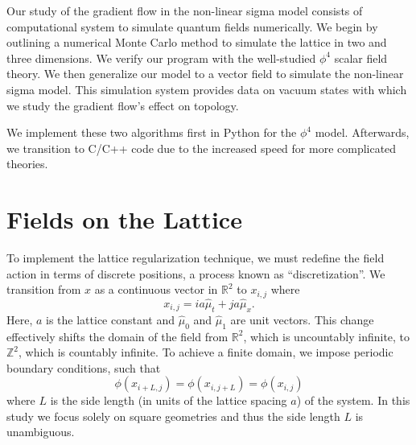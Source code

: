 Our study of the gradient flow in the non-linear sigma model consists of computational system to simulate quantum fields numerically. We begin by outlining a numerical Monte Carlo method to simulate the lattice in two and three dimensions. We verify our program with the well-studied $\phi^4$ scalar field theory. We then generalize our model to a vector field to simulate the non-linear sigma model. This simulation system provides data on vacuum states with which we study the gradient flow's effect on topology.

We implement these two algorithms first in Python for the $\phi^4$ model. Afterwards, we transition to C/C++ code due to the increased speed for more complicated theories. 



\section{Fields on the Lattice}
To implement the lattice regularization technique, we must redefine the field action in terms of discrete positions, a process known as ``discretization''. We transition from $x$ as a continuous vector in $\mathbb{R}^2$ to $x_{i,j}$ where
\begin{equation}
    x_{i,j} = ia \hat{\mu}_t + j a \hat{\mu}_x.
\end{equation}
Here, $a$ is the lattice constant and $\hat{\mu}_0$ and $\hat{\mu}_1$ are unit vectors. This change effectively shifts the domain of the field from $\mathbb{R}^2$, which is uncountably infinite, to $\mathbb{Z}^2$, which is countably infinite. To achieve a finite domain, we impose periodic boundary conditions, such that 
\begin{equation}
    \phi\left(x_{i+L,j}\right) = \phi\left(x_{i,j+L}\right) = \phi\left(x_{i,j}\right)
\end{equation}
where $L$ is the side length (in units of the lattice spacing $a$) of the system. In this study we focus solely on square geometries and thus the side length $L$ is unambiguous.

